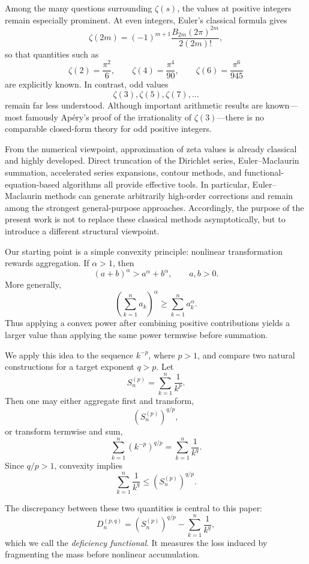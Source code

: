 \documentclass[11pt]{article}
\numberwithin{equation}{section}
\theoremstyle{definition}
\begin{document}
Among the many questions surrounding \(\zeta(s)\), the values at positive integers remain especially prominent. At even integers, Euler's classical formula gives
\[
\zeta(2m)=(-1)^{m+1}\frac{B_{2m}(2\pi)^{2m}}{2(2m)!},
\]
so that quantities such as
\[
\zeta(2)=\frac{\pi^2}{6},
\qquad
\zeta(4)=\frac{\pi^4}{90},
\qquad
\zeta(6)=\frac{\pi^6}{945}
\]
are explicitly known. In contrast, odd values
\[
\zeta(3),\zeta(5),\zeta(7),\dots
\]
remain far less understood. Although important arithmetic results are known---most famously Apéry's proof of the irrationality of \(\zeta(3)\)---there is no comparable closed-form theory for odd positive integers.

From the numerical viewpoint, approximation of zeta values is already classical and highly developed. Direct truncation of the Dirichlet series, Euler--Maclaurin summation, accelerated series expansions, contour methods, and functional-equation-based algorithms all provide effective tools. In particular, Euler--Maclaurin methods can generate arbitrarily high-order corrections and remain among the strongest general-purpose approaches. Accordingly, the purpose of the present work is not to replace these classical methods asymptotically, but to introduce a different structural viewpoint.

Our starting point is a simple convexity principle: nonlinear transformation rewards aggregation. If \(\alpha>1\), then
\[
(a+b)^\alpha>a^\alpha+b^\alpha,
\qquad a,b>0.
\]
More generally,
\[
\left(\sum_{k=1}^{n}a_k\right)^\alpha
\ge
\sum_{k=1}^{n}a_k^\alpha.
\]
Thus applying a convex power after combining positive contributions yields a larger value than applying the same power termwise before summation.

We apply this idea to the sequence \(k^{-p}\), where \(p>1\), and compare two natural constructions for a target exponent \(q>p\). Let
\[
S_n^{(p)}=\sum_{k=1}^{n}\frac{1}{k^p}.
\]
Then one may either aggregate first and transform,
\[
\left(S_n^{(p)}\right)^{q/p},
\]
or transform termwise and sum,
\[
\sum_{k=1}^{n}\left(k^{-p}\right)^{q/p}
=
\sum_{k=1}^{n}\frac{1}{k^q}.
\]
Since \(q/p>1\), convexity implies
\[
\sum_{k=1}^{n}\frac{1}{k^q}
\le
\left(S_n^{(p)}\right)^{q/p}.
\]

The discrepancy between these two quantities is central to this paper:
\[
D_n^{(p,q)}
=
\left(S_n^{(p)}\right)^{q/p}
-
\sum_{k=1}^{n}\frac{1}{k^q},
\]
which we call the \emph{deficiency functional}. It measures the loss induced by fragmenting the mass before nonlinear accumulation.
\end{document}
